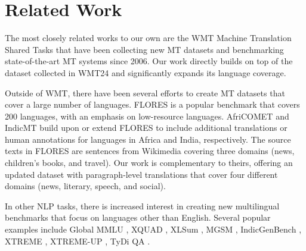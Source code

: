\section{Related Work}

The most closely related works to our own are the WMT Machine Translation Shared Tasks \citep[][\emph{inter alia}]{kocmi-etal-2024-findings} that have been collecting new MT datasets and benchmarking state-of-the-art MT systems since 2006.
Our work directly builds on top of the dataset collected in WMT24 and significantly expands its language coverage.

Outside of WMT, there have been several efforts to create MT datasets that cover a large number of languages.
FLORES \citep{flores101,nllb2022} is a popular benchmark that covers 200 languages, with an emphasis on low-resource languages.
AfriCOMET \citep{wang-etal-2024-afrimte} and IndicMT \citep{sai-b-etal-2023-indicmt} build upon or extend FLORES to include additional translations or human annotations for languages in Africa and India, respectively.
The source texts in FLORES are sentences from Wikimedia covering three domains (news, children's books, and travel).
Our work is complementary to theirs, offering an updated dataset with paragraph-level translations that cover four different domains (news, literary, speech, and social). 

In other NLP tasks, there is increased interest in creating new multilingual benchmarks that focus on languages other than English.
Several popular examples include Global MMLU \citep{singh2024globalmmluunderstandingaddressing},
XQUAD \citep{Artetxe:etal:2019},
XLSum \citep{hasan2021xlsumlargescalemultilingualabstractive},
MGSM \citep{shi2022languagemodelsmultilingualchainofthought},
IndicGenBench \citep{singh-etal-2024-indicgenbench},
XTREME \citep{hu2020xtreme},
XTREME-UP \citep{ruder-etal-2023-xtreme},
TyDi QA \citep{clark-etal-2020-tydi}.
